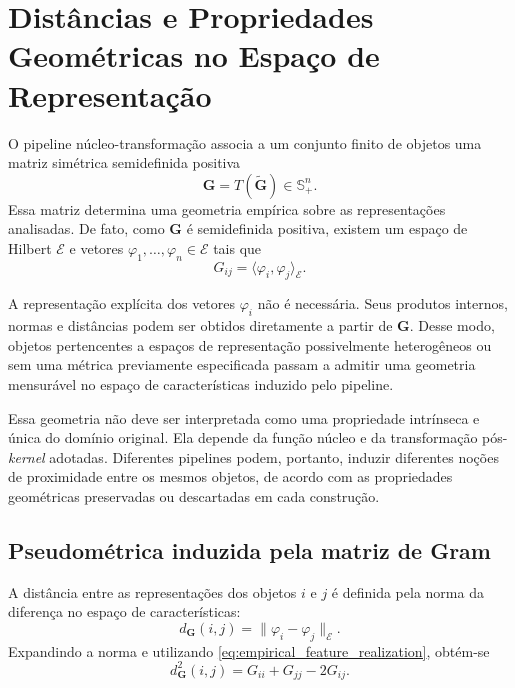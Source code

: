 
\section{Distâncias e Propriedades Geométricas no Espaço de Representação}
\label{sec:representation_geometry}

O pipeline núcleo-transformação associa a um conjunto finito de objetos uma
matriz simétrica semidefinida positiva
\begin{equation}\label{eq:transformed_gram_geometry}
    \mathbf{G}
    =
    T(\widetilde{\mathbf{G}})
    \in
    \mathbb{S}_+^n.
\end{equation}
Essa matriz determina uma geometria empírica sobre as representações
analisadas. De fato, como $\mathbf{G}$ é semidefinida positiva, existem um
espaço de Hilbert $\mathcal{E}$ e vetores
$\varphi_1,\dots,\varphi_n\in\mathcal{E}$ tais que
\begin{equation}\label{eq:empirical_feature_realization}
    G_{ij}
    =
    \langle
        \varphi_i,
        \varphi_j
    \rangle_{\mathcal{E}}.
\end{equation}

A representação explícita dos vetores $\varphi_i$ não é necessária. Seus
produtos internos, normas e distâncias podem ser obtidos diretamente a
partir de $\mathbf{G}$. Desse modo, objetos pertencentes a espaços de
representação possivelmente heterogêneos ou sem uma métrica previamente
especificada passam a admitir uma geometria mensurável no espaço de
características induzido pelo pipeline.

Essa geometria não deve ser interpretada como uma propriedade intrínseca e
única do domínio original. Ela depende da função núcleo e da transformação
pós-\textit{kernel} adotadas. Diferentes pipelines podem, portanto, induzir
diferentes noções de proximidade entre os mesmos objetos, de acordo com as
propriedades geométricas preservadas ou descartadas em cada construção.

\subsection{Pseudométrica induzida pela matriz de Gram}
\label{subsec:gram_pseudometric}

A distância entre as representações dos objetos $i$ e $j$ é definida pela
norma da diferença no espaço de características:
\begin{equation}\label{eq:induced_distance}
    d_{\mathbf{G}}(i,j)
    =
    \|
        \varphi_i-\varphi_j
    \|_{\mathcal{E}}.
\end{equation}
Expandindo a norma e utilizando \eqref{eq:empirical_feature_realization},
obtém-se
\begin{equation}\label{eq:gram_distance}
    d_{\mathbf{G}}^2(i,j)
    =
    G_{ii}
    +
    G_{jj}
    -
    2G_{ij}.
\end{equation}

